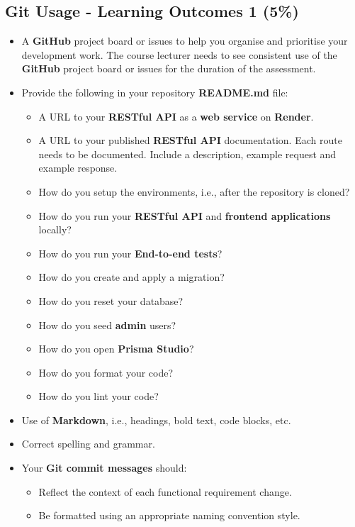 \documentclass{article}
\begin{document}
\subsection*{Git Usage - Learning Outcomes 1 (5\%)}
\begin{itemize}
	\item A \textbf{GitHub} project board or issues to help you organise and prioritise your development work. The course lecturer needs to see consistent use of the \textbf{GitHub} project board or issues for the duration of the assessment.
	\item Provide the following in your repository \textbf{README.md} file:
	\begin{itemize}
		\item A URL to your \textbf{RESTful API} as a \textbf{web service} on \textbf{Render}.
		\item A URL to your published \textbf{RESTful API} documentation. Each route needs to be documented. Include a description, example request and example response.
		\item How do you setup the environments, i.e., after the repository is cloned?
		\item How do you run your \textbf{RESTful API} and \textbf{frontend applications} locally?
		\item How do you run your \textbf{End-to-end tests}?
		\item How do you create and apply a migration?  
		\item How do you reset your database?
		\item How do you seed \textbf{admin} users?
		\item How do you open \textbf{Prisma Studio}?
		\item How do you format your code?
		\item How do you lint your code?		
	\end{itemize}
    \item Use of \textbf{Markdown}, i.e., headings, bold text, code blocks, etc.
    \item Correct spelling and grammar.
    \item Your \textbf{Git commit messages} should:
    \begin{itemize}
      \item Reflect the context of each functional requirement change.
      \item Be formatted using an appropriate naming convention style.
    \end{itemize}
\end{itemize}
\end{document}
